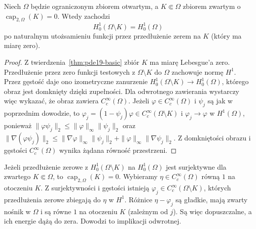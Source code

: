 \begin{wniosek}
\label{cor:pde19-H0}
Niech $\Omega$ będzie ograniczonym zbiorem otwartym,
a $K\Subset\Omega$ zbiorem zwartym o
$\operatorname{cap}_{2,\Omega}(K)=0$. Wtedy zachodzi
\[
 H_0^1(\Omega\setminus K)=H_0^1(\Omega)
\]
po naturalnym utożsamieniu funkcji przez przedłużenie zerem
na $K$ (który ma miarę zero).
\end{wniosek}
\begin{proof}
Z twierdzenia~\ref{thm:pde19-basic} zbiór $K$ ma miarę
Lebesgue'a zero. Przedłużenie przez zero funkcji
testowych z $\Omega\setminus K$ do $\Omega$ zachowuje
normę $H^1$. Przez gęstość daje ono izometryczne
zanurzenie $H_0^1(\Omega\setminus K)\to H_0^1(\Omega)$,
którego obraz jest domknięty dzięki zupełności.
Dla odwrotnego zawierania wystarczy więc wykazać,
że obraz zawiera $C_c^\infty(\Omega)$.
Jeżeli $\varphi\in C_c^\infty(\Omega)$ i $\psi_j$ są jak
w poprzednim dowodzie, to
$\varphi_j=(1-\psi_j)\varphi\in C_c^\infty(\Omega\setminus K)$
i $\varphi_j\to\varphi$ w $H^1(\Omega)$, ponieważ
$\|\varphi\psi_j\|_2\le\|\varphi\|_\infty\|\psi_j\|_2$
oraz
$\|\nabla(\varphi\psi_j)\|_2\le
\|\nabla\varphi\|_\infty\|\psi_j\|_2+
\|\varphi\|_\infty\|\nabla\psi_j\|_2$.
Z domkniętości obrazu i gęstości $C_c^\infty(\Omega)$
wynika żądana równość przestrzeni.
\end{proof}

\begin{uwaga}
Jeżeli przedłużenie zerowe z $H_0^1(\Omega\setminus K)$
na $H_0^1(\Omega)$ jest surjektywne dla zwartego
$K\Subset\Omega$, to $\operatorname{cap}_{2,\Omega}(K)=0$.
Wybieramy $\eta\in C_c^\infty(\Omega)$ równą $1$
na otoczeniu $K$. Z surjektywności i gęstości
istnieją $\varphi_j\in C_c^\infty(\Omega\setminus K)$,
których przedłużenia zerowe zbiegają do $\eta$ w $H^1$.
Różnice $\eta-\varphi_j$ są gładkie, mają zwarty
nośnik w $\Omega$ i są równe $1$ na otoczeniu $K$
(zależnym od $j$). Są więc dopuszczalne, a ich
energie dążą do zera. Dowodzi to implikacji odwrotnej.
\end{uwaga}


